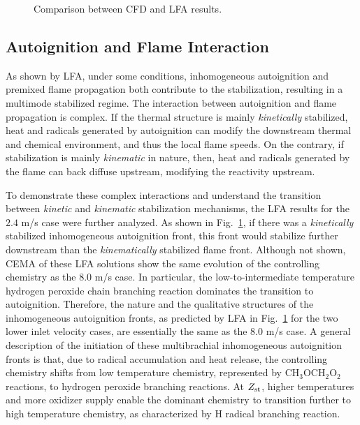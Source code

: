 \documentclass{wssci}
\begin{document}
\begin{figure}[t]
  \centering
  \scriptsize
  \resizebox{0.8\textwidth}{!}{}
  \normalsize
  \vspace{-0.2in}
  \caption{Comparison between CFD and LFA results.}
  \label{fig:LFA_V}
\end{figure}

\subsection{Autoignition and Flame Interaction}

As shown by LFA, under some conditions, inhomogeneous autoignition and premixed flame propagation both contribute to the stabilization, resulting in a multimode stabilized regime.  The interaction between autoignition and flame propagation is complex.  If the thermal structure is mainly \emph{kinetically} stabilized, heat and radicals generated by autoignition can modify the  downstream thermal and chemical environment, and thus the local flame speeds.  On the contrary, if stabilization is mainly \emph{kinematic} in nature, then, heat and radicals generated by the flame can back diffuse upstream, modifying the reactivity upstream.  

To demonstrate these complex interactions and understand the transition between \emph{kinetic} and \emph{kinematic} stabilization mechanisms, the LFA results for the $2.4$ m/s case were further analyzed.  As shown in Fig.~\ref{fig:LFA_V}, if there was a \emph{kinetically} stabilized inhomogeneous autoignition front, this front would stabilize further downstream than the \emph{kinematically} stabilized flame front.  Although not shown, CEMA of these LFA solutions show the same evolution of the controlling chemistry as the $8.0$ m/s case.  In particular, the low-to-intermediate temperature hydrogen peroxide chain branching reaction dominates the transition to autoignition.  Therefore, the nature and the qualitative structures of the inhomogeneous autoignition fronts, as predicted by LFA in Fig.~\ref{fig:LFA_V} for the two lower inlet velocity cases, are essentially the same as the $8.0$ m/s case.  A general description of the initiation of these multibrachial inhomogeneous autoignition fronts is that, due to radical accumulation and heat release, the controlling chemistry shifts from low temperature chemistry, represented by CH$_3$OCH$_2$O$_2$ reactions, to hydrogen peroxide branching reactions.  At $Z_{\rm st}$, higher temperatures and more oxidizer supply enable the dominant chemistry to transition further to high temperature chemistry, as characterized by H radical branching reaction.   
\end{document}

